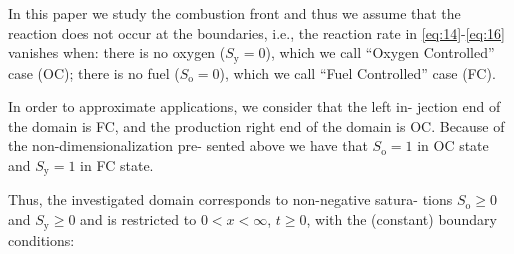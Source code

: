 In this paper we study the combustion front and
thus we assume that the reaction does not occur at the
boundaries, i.e., the reaction rate in \eqref{eq:14}-\eqref{eq:16} vanishes when: there
is no oxygen ($S_{\text{y}} = 0$), which we call ``Oxygen Controlled'' case (OC);
there is no fuel ($S_{\text{o}} = 0$), which we call ``Fuel Controlled'' case (FC).

In order to approximate applications, we consider that the left in-
jection end of the domain is FC, and the production right end
of the domain is OC. Because of the non-dimensionalization pre-
sented above we have that $S_{\text{o}} = 1$ in OC state and $S_{\text{y}} = 1$ in FC state.

Thus, the investigated domain corresponds to non-negative satura-
tions $S_{\text{o}} \geq 0$ and $S_{\text{y}} \geq 0$ and is restricted to $0<x<\infty$, $t\geq 0$, with
the (constant) boundary conditions:

